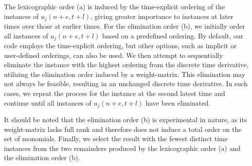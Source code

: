 \documentclass[runningheads]{llncs}
\newcommand{\1}{\chi}
\begin{document}
The lexicographic order (a) is induced by the time-explicit ordering of the instances of $u_j(n+e,t+l)$, giving greater importance to instances at later times over those at earlier times. For the elimination order (b), we initially order all instances of $u_j(n+e,t+l)$ based on a predefined ordering. By default, our code employs the time-explicit ordering, but other options, such as implicit or user-defined orderings, can also be used. We then attempt to sequentially eliminate the instance with the highest ordering from the discrete time derivative, utilizing the elimination order induced by a weight-matrix. This elimination may not always be feasible, resulting in an unchanged discrete time derivative. In such cases, we repeat the process for the instance at the second latest time and continue until all instances of $u_j(n+e,t+l)$ have been eliminated.

It should be noted that the elimination order (b) is experimental in nature, as its weight-matrix lacks full rank and therefore does not induce a total order on the set of monomials. Finally, we select the result with the fewest distinct time instances from the two remainders produced by the lexicographic order (a) and the elimination order (b).
\end{document}
